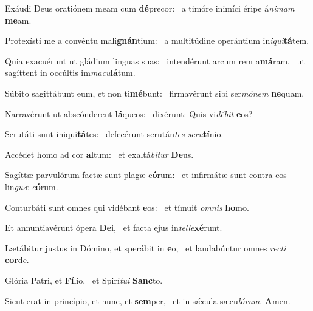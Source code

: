 \item Exáudi Deus oratiónem meam cum \textbf{dé}precor:~\psstar{} a timóre inimíci éripe á\textit{nimam} \textbf{me}am.
\item Protexísti me a convéntu mali\textbf{gnán}tium:~\psstar{} a multitúdine operántium in\textit{iqui}\textbf{tá}tem.
\item Quia exacuérunt ut gládium linguas suas:~\pscross{} intendérunt arcum rem a\textbf{má}ram,~\psstar{} ut sagíttent in occúltis im\textit{macu}\textbf{lá}tum.
\item Súbito sagittábunt eum, et non ti\textbf{mé}bunt:~\psstar{} firmavérunt sibi ser\textit{mónem} \textbf{ne}quam.
\item Narravérunt ut abscónderent \textbf{lá}queos:~\psstar{} dixérunt: Quis vi\textit{débit} \textbf{e}os?
\item Scrutáti sunt iniqui\textbf{tá}tes:~\psstar{} defecérunt scrután\textit{tes} \textit{scru}\textbf{tí}nio.
\item Accédet homo ad cor \textbf{al}tum:~\psstar{} et exaltá\textit{bitur} \textbf{De}us.
\item Sagíttæ parvulórum factæ sunt plagæ e\textbf{ó}rum:~\psstar{} et infirmátæ sunt contra eos lin\textit{guæ} \textit{e}\textbf{ó}rum.
\item Conturbáti sunt omnes qui vidébant \textbf{e}os:~\psstar{} et tímuit \textit{omnis} \textbf{ho}mo.
\item Et annuntiavérunt ópera \textbf{De}i,~\psstar{} et facta ejus in\textit{telle}\textbf{xé}runt.
\item Lætábitur justus in Dómino, et sperábit in \textbf{e}o,~\psstar{} et laudabúntur omnes \textit{recti} \textbf{cor}de.
\item Glória Patri, et \textbf{Fí}lio,~\psstar{} et Spirí\textit{tui} \textbf{Sanc}to.
\item Sicut erat in princípio, et nunc, et \textbf{sem}per,~\psstar{} et in sǽcula sæcu\textit{lórum}. \textbf{A}men.
